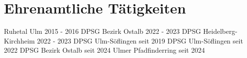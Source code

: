 \documentclass{cv}
\begin{document}
        \section{Ehrenamtliche Tätigkeiten}
        \resumeSubHeadingListStart\vspace*{1mm}
            {Ruhetal Ulm}
            {2015 - 2016}
            {DPSG Bezirk Ostalb}
            {2022 - 2023}
            {DPSG Heidelberg-Kirchheim}
            {2022 - 2023}
            {DPSG Ulm-Söflingen}
            {seit 2019}
            {DPSG Ulm-Söflingen}
            {seit 2022}
            {DPSG Bezirk Ostalb}
            {seit 2024}
            {Ulmer Pfadfinderring}
            {seit 2024}
        \resumeSubHeadingListEnd
\end{document}
